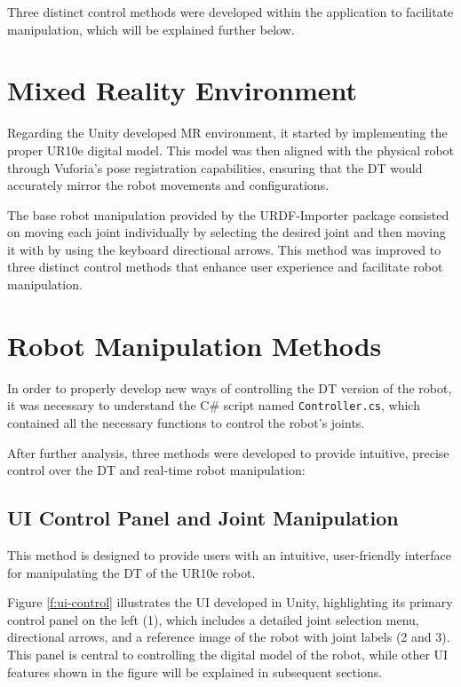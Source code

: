 Three distinct control methods were developed within the application to facilitate manipulation, which will be explained further below.


\section{Mixed Reality Environment}

Regarding the Unity developed \ac{MR} environment, it started by implementing the proper UR10e digital model. This model was then aligned with the physical robot through Vuforia's pose registration capabilities, ensuring that the \ac{DT} would accurately mirror the robot movements and configurations.

The base robot manipulation provided by the \ac{URDF}-Importer package consisted on moving each joint individually by selecting the desired joint and then moving it with by using the keyboard directional arrows. This method was improved to three distinct control methods that enhance user experience and facilitate robot manipulation.

\section{Robot Manipulation Methods}
In order to properly develop new ways of controlling the \ac{DT} version of the robot, it was necessary to understand the C\# script named \texttt{Controller.cs}, which contained all the necessary functions to control the robot's joints.


After further analysis, three methods were developed to provide intuitive, precise control over the \ac{DT} and real-time robot manipulation:

\subsection{UI Control Panel and Joint Manipulation}
\label{subsection:ui-control-method}
This method is designed to provide users with an intuitive, user-friendly interface for manipulating the \ac{DT} of the UR10e robot. 

Figure \ref{f:ui-control} illustrates the \ac{UI} developed in Unity, highlighting its primary control panel on the left (1), which includes a detailed joint selection menu, directional arrows, and a reference image of the robot with joint labels (2 and 3). This panel is central to controlling the digital model of the robot, while other \ac{UI} features shown in the figure will be explained in subsequent sections.


